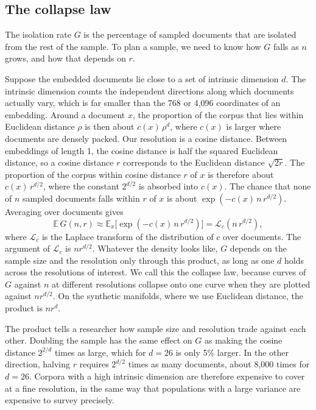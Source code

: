 \subsection{The collapse law}

The isolation rate $G$ is the percentage of sampled documents that are isolated from the rest of the sample. To plan a sample, we need to know how $G$ falls as $n$ grows, and how that depends on $r$.

Suppose the embedded documents lie close to a set of intrinsic dimension $d$. The intrinsic dimension counts the independent directions along which documents actually vary, which is far smaller than the 768 or 4{,}096 coordinates of an embedding. Around a document $x$, the proportion of the corpus that lies within Euclidean distance $\rho$ is then about $c(x)\, \rho^{d}$, where $c(x)$ is larger where documents are densely packed. Our resolution is a cosine distance. Between embeddings of length 1, the cosine distance is half the squared Euclidean distance, so a cosine distance $r$ corresponds to the Euclidean distance $\sqrt{2r}$. The proportion of the corpus within cosine distance $r$ of $x$ is therefore about $c(x)\, r^{d/2}$, where the constant $2^{d/2}$ is absorbed into $c(x)$. The chance that none of $n$ sampled documents falls within $r$ of $x$ is about $\exp(-c(x)\, n\, r^{d/2})$. Averaging over documents gives
\begin{equation}
\mathbb{E}\, G(n, r) \approx \mathbb{E}_{x}\big[\exp(-c(x)\, n\, r^{d/2})\big] = \mathcal{L}_{c}(n\, r^{d/2}),
\end{equation}
where $\mathcal{L}_{c}$ is the Laplace transform of the distribution of $c$ over documents. The argument of $\mathcal{L}_{c}$ is $n r^{d/2}$. Whatever the density looks like, $G$ depends on the sample size and the resolution only through this product, as long as one $d$ holds across the resolutions of interest. We call this the collapse law, because curves of $G$ against $n$ at different resolutions collapse onto one curve when they are plotted against $n r^{d/2}$. On the synthetic manifolds, where we use Euclidean distance, the product is $n r^{d}$.

The product tells a researcher how sample size and resolution trade against each other. Doubling the sample has the same effect on $G$ as making the cosine distance $2^{2/d}$ times as large, which for $d = 26$ is only 5\% larger. In the other direction, halving $r$ requires $2^{d/2}$ times as many documents, about 8{,}000 times for $d = 26$. Corpora with a high intrinsic dimension are therefore expensive to cover at a fine resolution, in the same way that populations with a large variance are expensive to survey precisely.

